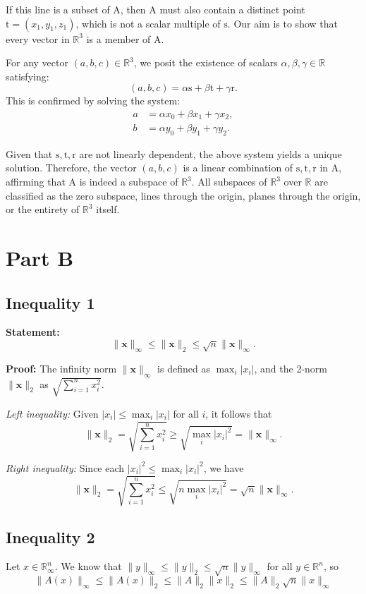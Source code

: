 \documentclass{article}
\begin{document}
If this line is a subset of \(\mathrm{A}\), then \(\mathrm{A}\) must also contain a distinct point \(\mathrm{t} = (x_1, y_1, z_1)\), which is not a scalar multiple of \(\mathrm{s}\). Our aim is to show that every vector in \(\mathbb{R}^3\) is a member of \(\mathrm{A}\). 

For any vector \((a, b, c) \in \mathbb{R}^3\), we posit the existence of scalars \(\alpha, \beta, \gamma \in \mathbb{R}\) satisfying:
\[
(a, b, c) = \alpha \mathrm{s} + \beta \mathrm{t} + \gamma \mathrm{r}.
\]
This is confirmed by solving the system:
\[
\begin{aligned}
a &= \alpha x_0 + \beta x_1 + \gamma x_2, \\
b &= \alpha y_0 + \beta y_1 + \gamma y_2.
\end{aligned}
\]

Given that \(\mathrm{s}, \mathrm{t}, \mathrm{r}\) are not linearly dependent, the above system yields a unique solution. Therefore, the vector \((a, b, c)\) is a linear combination of \(\mathrm{s}, \mathrm{t}, \mathrm{r}\) in \(\mathrm{A}\), affirming that \(\mathrm{A}\) is indeed a subspace of \(\mathbb{R}^3\).
All subspaces of \(\mathbb{R}^3\) over \(\mathbb{R}\) are classified as the zero subspace, lines through the origin, planes through the origin, or the entirety of \(\mathbb{R}^3\) itself.
\section{Part B}
\subsection{Inequality 1}
\textbf{Statement:} 
\[
\| \boldsymbol{x} \|_{\infty} \leq \| \boldsymbol{x} \|_2 \leq \sqrt{n} \| \boldsymbol{x} \|_{\infty}.
\]

\textbf{Proof:} 
The infinity norm \(\| \boldsymbol{x} \|_{\infty}\) is defined as \(\max_i |x_i|\), and the 2-norm \(\| \boldsymbol{x} \|_2\) as \(\sqrt{\sum_{i=1}^n x_i^2}\).

\textit{Left inequality:} Given \(|x_i| \leq \max_i |x_i|\) for all \(i\), it follows that
\[
\| \boldsymbol{x} \|_2 = \sqrt{\sum_{i=1}^n x_i^2} \geq \sqrt{\max_i |x_i|^2} = \| \boldsymbol{x} \|_{\infty}.
\]

\textit{Right inequality:} Since each \(|x_i|^2 \leq \max_i |x_i|^2\), we have
\[
\| \boldsymbol{x} \|_2 = \sqrt{\sum_{i=1}^n x_i^2} \leq \sqrt{n \max_i |x_i|^2} = \sqrt{n} \| \boldsymbol{x} \|_{\infty}.
\]
\subsection{Inequality 2}
Let $x \in \mathbb{R}_{\infty}^n$. We know that $\|y\|_{\infty} \leq\|y\|_2 \leq \sqrt{n}\|y\|_{\infty}$ for all $y \in \mathbb{R}^n$, so
$$
\|A(x)\|_{\infty} \leq\|A(x)\|_2 \leq\|A\|_2\|x\|_2 \leq\|A\|_2 \sqrt{n}\|x\|_{\infty}
$$
\end{document}
